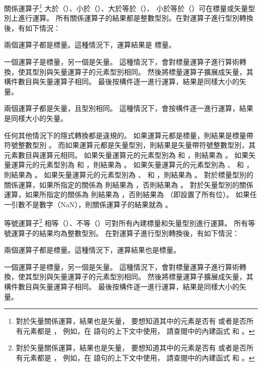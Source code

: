 \startitem
關係運算子\footnote{
對於矢量關係運算，結果也是矢量，
要想知道其中的元素是否有  或者是否所有元素都是 ，
例如，在  語句的上下文中使用，
請查閱中的內建函式  和 。}
大於（\ccmm{>}）、小於（\ccmm{<}）、大於等於（\ccmm{>=}）、
小於等於（\ccmm{<=}）可在標量或矢量型別上進行運算。
所有關係運算子的結果都是整數型別。在對運算子進行型別轉換後，有如下情況：
\startigBase
\item 兩個運算子都是標量。這種情況下，運算結果是  標量。

\item 一個運算子是標量，另一個是矢量。
這種情況下，會對標量運算子進行算術轉換，使其型別與矢量運算子的元素型別相同。
然後將標量運算子擴展成矢量，其構件數目與矢量運算子相同。
最後按構件逐一進行運算，結果是同樣大小的矢量。

\item 兩個運算子都是矢量，且型別相同。
這種情況下，會按構件逐一進行運算，結果是同樣大小的矢量。
\stopigBase

任何其他情況下的隱式轉換都是違規的。
如果運算元都是標量，則結果是標量帶符號整數型別 。
而如果運算元都是矢量型別，則結果是矢量帶符號整數型別，其元素數目與運算元相同。
如果矢量運算元的元素型別為  和 ，則結果為 。
如果矢量運算元的元素型別為  和 ，則結果為 。
如果矢量運算元的元素型別為 、  和 ，則結果為 。
如果矢量運算元的元素型別為 、  和 ，則結果為 。
對於標量型別的關係運算，如果所指定的關係為  則結果為 ，否則結果為 。
對於矢量型別的關係運算，如果所指定的關係為  則結果為 ，否則結果為  （即設置了所有位）。
如果任一引數不是數字（NaN），則關係運算子的結果就為 。
\stopitem

\startitem
等號運算子\footnote{
對於矢量關係運算，結果也是矢量，
要想知道其中的元素是否有  或者是否所有元素都是 ，
例如，在  語句的上下文中使用，
請查閱中的內建函式  和 。}
相等（\ccmm{==}）、不等（\ccmm{!=}）可對所有內建標量和矢量型別進行運算。
所有等號運算子的結果均為整數型別。
在對運算子進行型別轉換後，有如下情況：
\startigBase
\item 兩個運算子都是標量。這種情況下，運算結果也是標量。

\item 一個運算子是標量，另一個是矢量。
這種情況下，會對標量運算子進行算術轉換，使其型別與矢量運算子的元素型別相同。
然後將標量運算子擴展成矢量，其構件數目與矢量運算子相同。
最後按構件逐一進行運算，結果是同樣大小的矢量。

